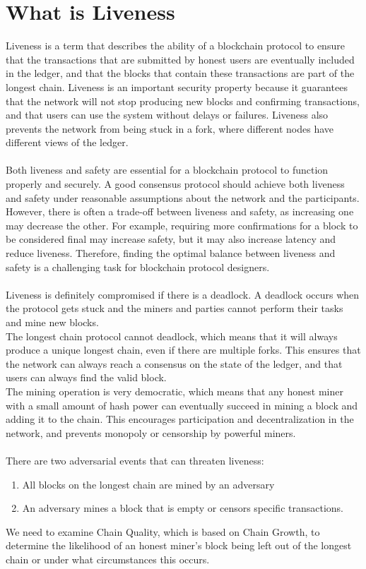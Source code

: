 \section{What is Liveness}
Liveness is a term that describes the ability of a blockchain protocol to ensure that the transactions that are submitted by honest users are eventually included in the ledger, and that the blocks that contain these transactions are part of the longest chain. Liveness is an important security property because it guarantees that the network will not stop producing new blocks and confirming transactions, and that users can use the system without delays or failures. Liveness also prevents the network from being stuck in a fork, where different nodes have different views of the ledger.\\\\
Both liveness and safety are essential for a blockchain protocol to function properly and securely. A good consensus protocol should achieve both liveness and safety under reasonable assumptions about the network and the participants. However, there is often a trade-off between liveness and safety, as increasing one may decrease the other. For example, requiring more confirmations for a block to be considered final may increase safety, but it may also increase latency and reduce liveness. Therefore, finding the optimal balance between liveness and safety is a challenging task for blockchain protocol designers.\\\\
Liveness is definitely compromised if there is a deadlock. A deadlock occurs when the protocol gets stuck and the miners and parties cannot perform their tasks and mine new blocks.\\
 The longest chain protocol cannot deadlock, which means that it will always produce a unique longest chain, even if there are multiple forks. This ensures that the network can always reach a consensus on the state of the ledger, and that users can always find the valid block.\\
The mining operation is very democratic, which means that any honest miner with a small amount of hash power can eventually succeed in mining a block and adding it to the chain. This encourages participation and decentralization in the network, and prevents monopoly or censorship by powerful miners.\\\\
There are two adversarial events that can threaten liveness:
\begin{enumerate}
    \item All blocks on the longest chain are mined by an adversary
    \item An adversary mines a block that is empty or censors specific transactions.
\end{enumerate} 
We need to examine Chain Quality, which is based on Chain Growth, to determine the likelihood of an honest miner’s block being left out of the longest chain or under what circumstances this occurs.

